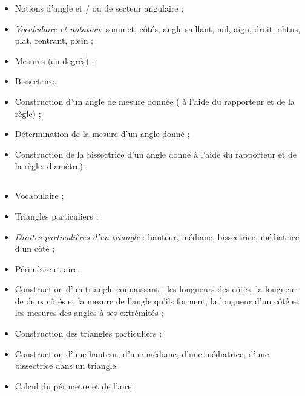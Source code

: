 \savoir
\begin{itemize}
\item Notions d'angle et / ou de
secteur angulaire ;
\item \textit{Vocabulaire et notation}: sommet, côtés, angle saillant, nul, aigu, droit, obtus, plat, rentrant, plein ;
\item Mesures (en degrés) ;
\item Bissectrice.
\end{itemize}
\savoirfaire
\begin{itemize}
\item Construction d'un angle de mesure donnée ( à l'aide du rapporteur et de la règle) ;
\item Détermination de la mesure d'un angle donné ;
\item Construction de la bissectrice d'un angle donné à l'aide du rapporteur et de la règle. diamètre).
\end{itemize}

\subsection*{}

\savoir
\begin{itemize}
\item Vocabulaire ;
\item Triangles particuliers ;
\item \textit{Droites particulières d'un triangle} : hauteur, médiane, bissectrice, médiatrice d'un côté ;
\item Périmètre et aire.
\end{itemize}
\savoirfaire
\begin{itemize}
\item Construction d'un triangle connaissant : les longueurs des côtés, la longueur de deux côtés et la mesure de l'angle qu'ils forment, la
longueur d'un côté et les mesures des angles à ses extrémités ;
\item Construction des triangles particuliers ;
\item Construction d'une hauteur, d'une médiane, d'une médiatrice, d'une bissectrice dans un triangle.
\item  Calcul du périmètre et de l'aire.
\end{itemize}

\subsection*{}

